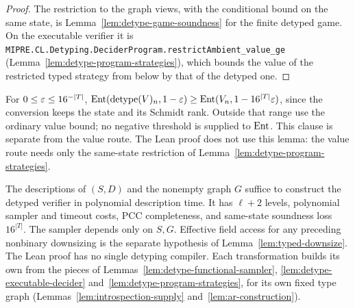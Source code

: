 \begin{proof}
\leanok
{}
The restriction to the graph views, with the conditional bound on the same state, is
Lemma~\ref{lem:detype-game-soundness} for the finite detyped game. On the executable verifier
it is \texttt{MIPRE.CL.Detyping.DeciderProgram.restrictAmbient\_value\_ge}
(Lemma~\ref{lem:detype-program-strategies}), which bounds the value of the restricted typed
strategy from below by that of the detyped one.
\end{proof}

\begin{lemma}
\label{lem:detype-entanglement}
For $0\leq\varepsilon\leq16^{-|T|}$,
$\mathrm{Ent}(\mathrm{detype}(V)_n,1-\varepsilon)\geq
\mathrm{Ent}(V_n,1-16^{|T|}\varepsilon)$, since the conversion keeps the state and its
Schmidt rank. Outside that range use the ordinary value bound; no negative
threshold is supplied to $\mathrm{Ent}$. This clause is separate from the value route.
The Lean proof does not use this lemma: the value route needs only the same-state
restriction of Lemma~\ref{lem:detype-program-strategies}.
\end{lemma}

\begin{lemma}
\label{lem:detype-compiler}
The descriptions of $(S,D)$ and the nonempty graph $G$ suffice to construct
the detyped verifier in polynomial description time. It has $\ell+2$ levels,
polynomial sampler and timeout costs, PCC completeness, and same-state
soundness loss $16^{|T|}$. The sampler depends only on $S,G$.
Effective field access for any preceding nonbinary downsizing is the separate
hypothesis of Lemma~\ref{lem:typed-downsize}.
The Lean proof has no single detyping compiler. Each transformation builds its own from the
pieces of Lemmas~\ref{lem:detype-functional-sampler}, \ref{lem:detype-executable-decider}
and~\ref{lem:detype-program-strategies}, for its own fixed type graph
(Lemmas~\ref{lem:introspection-supply} and~\ref{lem:ar-construction}).
\end{lemma}

